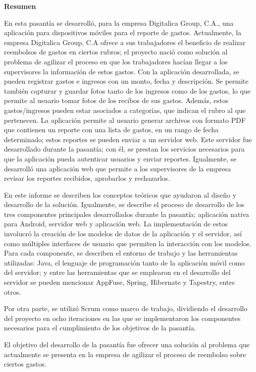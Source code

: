 \setcounter{page}{3}
\begin{center}
	{\bf Resumen}  %
\end{center}	

En esta pasantía se desarrolló, para la empresa Digitalica Group, C.A., una aplicación para dispositivos móviles para el reporte de gastos. Actualmente, la empresa Digitalica Group, C.A ofrece a sus trabajadores el beneficio de realizar reembolsos de gastos en ciertos rubros; el proyecto nació como solución al problema de agilizar el proceso en que los trabajadores hacían llegar a los supervisores la información de estos gastos. Con la aplicación desarrollada, se pueden registrar gastos e ingresos con un monto, fecha y descripción. Se permite también capturar y guardar fotos tanto de los ingresos como de los gastos, lo que permite al usuario tomar fotos de los recibos de sus gastos. Además, estos gastos/ingresos pueden estar asociados a categorías, que indican el rubro al que pertenecen. La aplicación permite al usuario generar archivos con formato PDF que contienen un reporte con una lista de gastos, en un rango de fecha determinado; estos reportes se pueden enviar a un servidor web. Este servidor fue desarrollado durante la pasantía; con él, se prestan los servicios necesarios para que la aplicación pueda autenticar usuarios y enviar reportes. Igualmente, se desarrolló una aplicación web que permite a los supervisores de la empresa revisar los reportes recibidos, aprobarlos y rechazarlos.

En este informe se describen los conceptos teóricos que ayudaron al diseño y desarrollo de la solución. Igualmente, se describe el proceso de desarrollo de los tres componentes principales desarrollados durante la pasantía: aplicación nativa para Android, servidor web y aplicación web. La implementación de estos involucró la creación de los modelos de datos de la aplicación y el servidor, así como múltiples interfaces de usuario que permiten la interacción con los modelos. Para cada componente, se describen el entorno de trabajo y las herramientas utilizadas: Java, el lenguaje de programación tanto de la aplicación móvil como del servidor; y entre las herramientas que se emplearon en el desarrollo del servidor se pueden mencionar AppFuse, Spring, Hibernate y Tapestry, entre otros.

Por otra parte, se utilizó Scrum como marco de trabajo, dividiendo el desarrollo del proyecto en ocho iteraciones en las que se implementaron los componentes necesarios para el cumplimiento de los objetivos de la pasantía.

El objetivo del desarrollo de la pasantía fue ofrecer una solución al problema que actualmente se presenta en la empresa de agilizar el proceso de reembolso sobre ciertos gastos.


